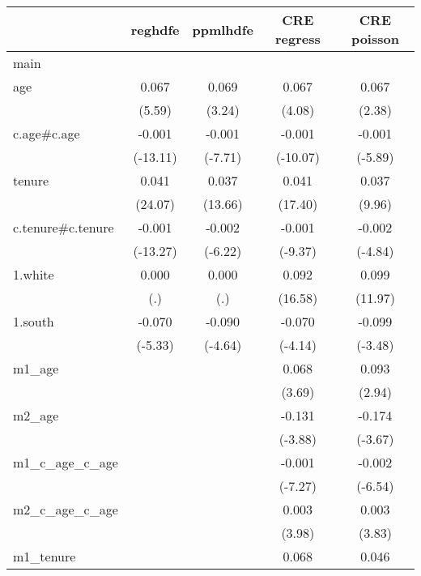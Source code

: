 \begin{tabular}{l*{4}{c}}
\hline\hline
            &\multicolumn{1}{c}{reghdfe}&\multicolumn{1}{c}{ppmlhdfe}&\multicolumn{1}{c}{CRE regress}&\multicolumn{1}{c}{CRE poisson}\\
\hline
main        &            &            &            &            \\
age         &       0.067&       0.069&       0.067&       0.067\\
            &      (5.59)&      (3.24)&      (4.08)&      (2.38)\\
c.age\#c.age &      -0.001&      -0.001&      -0.001&      -0.001\\
            &    (-13.11)&     (-7.71)&    (-10.07)&     (-5.89)\\
tenure      &       0.041&       0.037&       0.041&       0.037\\
            &     (24.07)&     (13.66)&     (17.40)&      (9.96)\\
c.tenure\#c.tenure&      -0.001&      -0.002&      -0.001&      -0.002\\
            &    (-13.27)&     (-6.22)&     (-9.37)&     (-4.84)\\
1.white     &       0.000&       0.000&       0.092&       0.099\\
            &         (.)&         (.)&     (16.58)&     (11.97)\\
1.south     &      -0.070&      -0.090&      -0.070&      -0.099\\
            &     (-5.33)&     (-4.64)&     (-4.14)&     (-3.48)\\
m1\_age      &            &            &       0.068&       0.093\\
            &            &            &      (3.69)&      (2.94)\\
m2\_age      &            &            &      -0.131&      -0.174\\
            &            &            &     (-3.88)&     (-3.67)\\
m1\_c\_age\_c\_age&            &            &      -0.001&      -0.002\\
            &            &            &     (-7.27)&     (-6.54)\\
m2\_c\_age\_c\_age&            &            &       0.003&       0.003\\
            &            &            &      (3.98)&      (3.83)\\
m1\_tenure   &            &            &       0.068&       0.046\\

\end{tabular}
